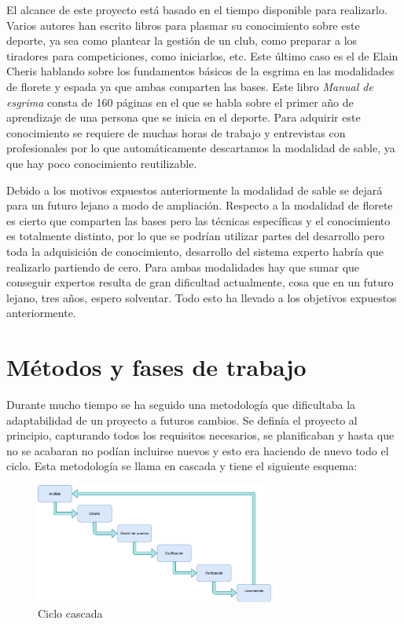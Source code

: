\documentclass[11pt,a4paper,twoside,final]{article}
\begin{document}
El alcance de este proyecto está basado en el tiempo disponible para realizarlo. Varios autores han escrito libros para plasmar su conocimiento sobre este deporte, ya sea como plantear la gestión de un club, como preparar a los tiradores para competiciones, como iniciarlos, etc. Este último caso es el de Elain Cheris hablando sobre los fundamentos básicos de la esgrima en las modalidades de florete y espada ya que ambas comparten las bases. Este libro \textit{Manual de esgrima} \cite{manualdeesgrima} consta de 160 páginas en el que se habla sobre el primer año de aprendizaje de una persona que se inicia en el deporte. Para adquirir este conocimiento se requiere de muchas horas de trabajo y entrevistas con profesionales por lo que automáticamente descartamos la modalidad de sable, ya que hay poco conocimiento reutilizable.

\bigskip
Debido a los motivos expuestos anteriormente la modalidad de sable se dejará para un futuro lejano a modo de ampliación. Respecto a la modalidad de florete es cierto que comparten las bases pero las técnicas específicas y el conocimiento es totalmente distinto, por lo que se podrían utilizar partes del desarrollo pero toda la adquisición de conocimiento, desarrollo del sistema experto habría que realizarlo partiendo de cero. Para ambas modalidades hay que sumar que conseguir expertos resulta de gran dificultad actualmente, cosa que en un futuro lejano, tres años, espero solventar. Todo esto ha llevado a los objetivos expuestos anteriormente.

\fi


\newpage

\section{Métodos y fases de trabajo}

Durante mucho tiempo se ha seguido una metodología que dificultaba la adaptabilidad de un proyecto a futuros cambios. Se definía el proyecto al principio, capturando todos los requisitos necesarios, se planificaban y hasta que no se acabaran no podían incluirse nuevos y esto era haciendo de nuevo todo el ciclo. Esta metodología se llama en cascada y tiene el siguiente esquema:

\begin{figure}[H]
  \centering
   \includegraphics[width=0.7\textwidth]{Cascada.pdf}
   \caption{Ciclo cascada}
  \label{Ciclo cascada}
\end{figure}
\end{document}
